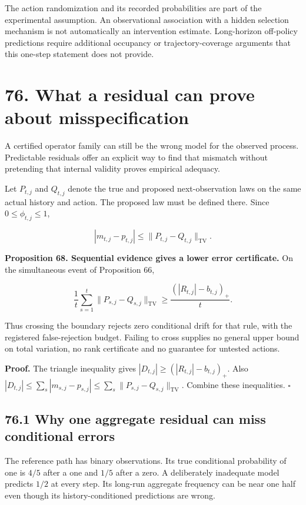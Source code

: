 \documentclass[11pt,letterpaper]{article}
\begin{document}
The action randomization and its recorded probabilities are part of the
experimental assumption. An observational association with a hidden
selection mechanism is not automatically an intervention estimate.
Long-horizon off-policy predictions require additional occupancy or
trajectory-coverage arguments that this one-step statement does not
provide.

\section{76. What a residual can prove about
misspecification}\label{what-a-residual-can-prove-about-misspecification}

A certified operator family can still be the wrong model for the
observed process. Predictable residuals offer an explicit way to find
that mismatch without pretending that internal validity proves empirical
adequacy.

Let \(P_{t,j}\) and \(Q_{t,j}\) denote the true and proposed
next-observation laws on the same actual history and action. The
proposed law must be defined there. Since \(0\leq\phi_{t,j}\leq1\),

\[
|m_{t,j}-p_{t,j}|\leq\|P_{t,j}-Q_{t,j}\|_{\mathrm{TV}}.
\]

\textbf{Proposition 68. Sequential evidence gives a lower error
certificate.} On the simultaneous event of Proposition 66,

\[
\boxed{
\frac1t\sum_{s=1}^t\|P_{s,j}-Q_{s,j}\|_{\mathrm{TV}}
\geq\frac{(|R_{t,j}|-b_{t,j})_+}{t}.
}
\]

Thus crossing the boundary rejects zero conditional drift for that rule,
with the registered false-rejection budget. Failing to cross supplies no
general upper bound on total variation, no rank certificate and no
guarantee for untested actions.

\textbf{Proof.} The triangle inequality gives
\(|D_{t,j}|\geq(|R_{t,j}|-b_{t,j})_+\). Also
\(|D_{t,j}|\leq\sum_s|m_{s,j}-p_{s,j}|\leq\sum_s\|P_{s,j}-Q_{s,j}\|_{\mathrm{TV}}\).
Combine these inequalities. \(\square\)

\subsection{76.1 Why one aggregate residual can miss conditional
errors}\label{why-one-aggregate-residual-can-miss-conditional-errors}

The reference path has binary observations. Its true conditional
probability of one is \(4/5\) after a one and \(1/5\) after a zero. A
deliberately inadequate model predicts \(1/2\) at every step. Its
long-run aggregate frequency can be near one half even though its
history-conditioned predictions are wrong.
\end{document}
